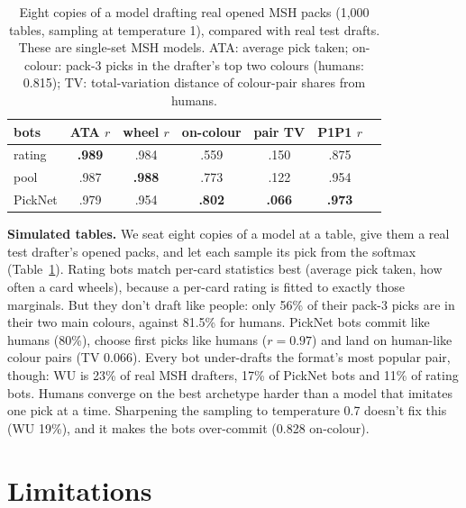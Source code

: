 \documentclass[10pt,letterpaper]{article}
\begin{document}
\begin{table}[t]
\centering\small
\caption{Eight copies of a model drafting real opened MSH packs (1,000 tables, sampling at temperature 1),
compared with real test drafts. These are single-set MSH models. ATA: average pick taken; on-colour:
pack-3 picks in the drafter's top two colours (humans: 0.815); TV: total-variation distance of colour-pair
shares from humans.}
\label{tab:sim}
\setlength{\tabcolsep}{3.2pt}
\begin{tabular}{lcccccc}
\toprule
bots & ATA $r$ & wheel $r$ & on-colour & pair TV & P1P1 $r$ \\
\midrule
rating & \textbf{.989} & .984 & .559 & .150 & .875 \\
pool & .987 & \textbf{.988} & .773 & .122 & .954 \\
PickNet & .979 & .954 & \textbf{.802} & \textbf{.066} & \textbf{.973} \\
\bottomrule
\end{tabular}
\end{table}

\textbf{Simulated tables.} We seat eight copies of a model at a table, give them a real test drafter's
opened packs, and let each sample its pick from the softmax (Table~\ref{tab:sim}). Rating bots match per-card
statistics best (average pick taken, how often a card wheels), because a per-card rating is fitted to exactly
those marginals. But they don't draft like people: only 56\% of their pack-3 picks are in their two main
colours, against 81.5\% for humans. PickNet bots commit like humans (80\%), choose first picks like humans
($r=0.97$) and land on human-like colour pairs (TV 0.066). Every bot under-drafts the format's most popular
pair, though: WU is 23\% of real MSH drafters, 17\% of PickNet bots and 11\% of rating bots. Humans converge
on the best archetype harder than a model that imitates one pick at a time. Sharpening the sampling to
temperature 0.7 doesn't fix this (WU 19\%), and it makes the bots over-commit (0.828 on-colour).

\section{Limitations}
\end{document}
